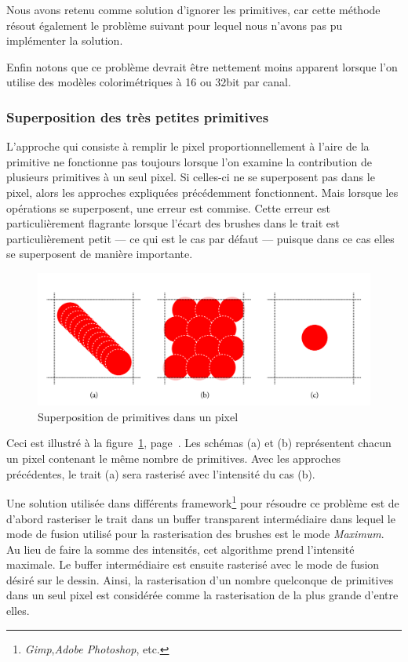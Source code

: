 			Nous avons retenu comme solution d'ignorer les primitives, car cette méthode résout également le problème suivant
			pour lequel nous n'avons pas pu implémenter la solution.
			
			Enfin notons que ce problème devrait être nettement moins apparent lorsque l'on utilise des modèles 
			colorimétriques à 16 ou 32bit par canal.

		\subsubsection{Superposition des très petites primitives}
			L'approche qui consiste à remplir le pixel proportionnellement à l'aire de la primitive ne fonctionne
			pas toujours lorsque l'on examine la contribution de plusieurs primitives à un seul pixel. 
			Si celles-ci ne se superposent pas dans le pixel, alors les approches expliquées précédemment fonctionnent.
			Mais lorsque les opérations se superposent, une erreur est commise.  Cette erreur est particulièrement
			flagrante lorsque l'écart des brushes dans le trait est particulièrement petit --- ce qui est le cas par défaut --- puisque dans ce cas elles
			se superposent de manière importante.

				\begin{figure}[ht]
					\centering
					\includegraphics[width=\textwidth]{images/superposition-primitives} 
					\caption{Superposition de primitives dans un pixel}
					\label{fig:superposition}
				\end{figure}
			
			Ceci est illustré à la figure~\ref{fig:superposition}, page~\pageref{fig:superposition}. Les schémas (a) et (b)
			représentent chacun un pixel contenant le même nombre de primitives. Avec les approches précédentes, le trait (a)
			sera rasterisé avec l'intensité du cas (b).

			Une solution utilisée dans différents framework\footnote{\emph{Gimp},\emph{Adobe Photoshop}, etc.} pour résoudre ce problème est de d'abord rasteriser le trait
			dans un buffer transparent intermédiaire dans lequel le mode de fusion utilisé pour la rasterisation des 
			brushes est le mode \emph{Maximum}. Au lieu de faire la somme des intensités, cet algorithme prend l'intensité maximale.  
			Le buffer intermédiaire est ensuite rasterisé avec le mode
			de fusion désiré sur le dessin.  Ainsi, la rasterisation d'un nombre quelconque de primitives dans un seul pixel
			est considérée comme la rasterisation de la plus grande d'entre elles. 
			
